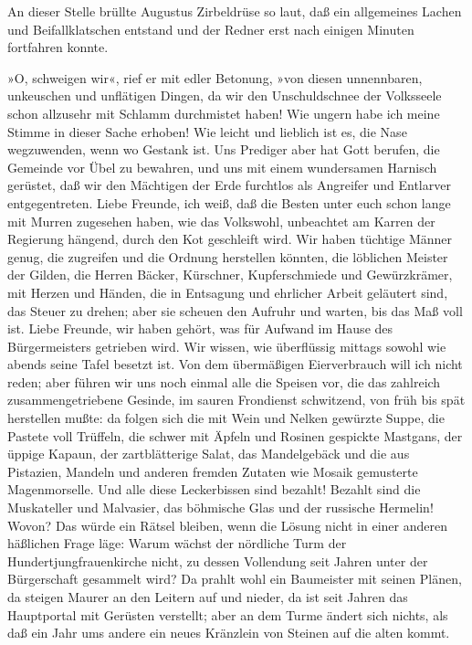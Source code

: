 An dieser Stelle brüllte Augustus Zirbeldrüse so laut, daß ein
allgemeines Lachen und Beifallklatschen entstand und der Redner
erst nach einigen Minuten fortfahren konnte.

»O, schweigen wir«, rief er mit edler Betonung, »von diesen
unnennbaren, unkeuschen und unflätigen Dingen, da wir den
Unschuldschnee der Volksseele schon allzusehr mit Schlamm
durchmistet haben! Wie ungern habe ich meine Stimme in dieser Sache
erhoben! Wie leicht und lieblich ist es, die Nase wegzuwenden, wenn
wo Gestank ist. Uns Prediger aber hat Gott berufen, die Gemeinde
vor Übel zu bewahren, und uns mit einem wundersamen Harnisch
gerüstet, daß wir den Mächtigen der Erde furchtlos als Angreifer
und Entlarver entgegentreten. Liebe Freunde, ich weiß, daß die
Besten unter euch schon lange mit Murren zugesehen haben, wie das
Volkswohl, unbeachtet am Karren der Regierung hängend, durch den
Kot geschleift wird. Wir haben tüchtige\pagenum{[35]} Männer
genug, die zugreifen und die Ordnung herstellen könnten, die
löblichen Meister der Gilden, die Herren Bäcker, Kürschner,
Kupferschmiede und Gewürzkrämer, mit Herzen und Händen, die in
Entsagung und ehrlicher Arbeit geläutert sind, das Steuer zu
drehen; aber sie scheuen den Aufruhr und warten, bis das Maß voll
ist. Liebe Freunde, wir haben gehört, was für Aufwand im Hause des
Bürgermeisters getrieben wird. Wir wissen, wie überflüssig mittags
sowohl wie abends seine Tafel besetzt ist. Von dem übermäßigen
Eierverbrauch will ich nicht reden; aber führen wir uns noch einmal
alle die Speisen vor, die das zahlreich zusammengetriebene Gesinde,
im sauren Frondienst schwitzend, von früh bis spät herstellen
mußte: da folgen sich die mit Wein und Nelken gewürzte Suppe, die
Pastete voll Trüffeln, die schwer mit Äpfeln und Rosinen gespickte
Mastgans, der üppige Kapaun, der zartblätterige Salat, das
Mandelgebäck und die aus Pistazien, Mandeln und anderen fremden
Zutaten wie Mosaik gemusterte Magenmorselle. Und alle diese
Leckerbissen sind bezahlt! Bezahlt sind die Muskateller und
Malvasier, das böhmische Glas und der russische Hermelin! Wovon?
Das würde ein Rätsel bleiben, wenn die Lösung nicht in einer
anderen häßlichen Frage läge: Warum wächst der nördliche Turm der
Hundertjungfrauenkirche nicht, zu dessen Vollendung seit Jahren
unter der Bürgerschaft gesammelt wird? Da prahlt wohl ein
Baumeister mit seinen Plänen, da steigen Maurer an den Leitern auf
und nieder, da ist seit Jahren das Hauptportal mit Gerüsten
verstellt; aber an dem Turme ändert sich nichts, als daß ein Jahr
ums andere ein neues Kränzlein von Steinen auf die alten kommt.
